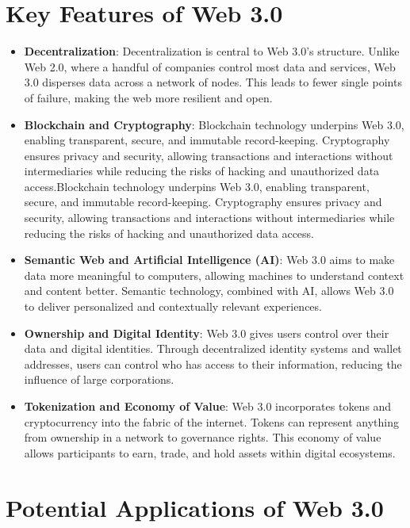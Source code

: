 \documentclass[12pt]{article}
\begin{document}
\section{Key Features of Web 3.0}

\begin{itemize}
    \item \textbf{Decentralization}: Decentralization is central to Web 3.0’s structure. Unlike Web 2.0, where a handful of companies control most data and services, Web 3.0 disperses data across a network of nodes. This leads to fewer single points of failure, making the web more resilient and open.
    \item \textbf{Blockchain and Cryptography}: Blockchain technology underpins Web 3.0, enabling transparent, secure, and immutable record-keeping. Cryptography ensures privacy and security, allowing transactions and interactions without intermediaries while reducing the risks of hacking and unauthorized data access.Blockchain technology underpins Web 3.0, enabling transparent, secure, and immutable record-keeping. Cryptography ensures privacy and security, allowing transactions and interactions without intermediaries while reducing the risks of hacking and unauthorized data access.
    \item \textbf{Semantic Web and Artificial Intelligence (AI)}: Web 3.0 aims to make data more meaningful to computers, allowing machines to understand context and content better. Semantic technology, combined with AI, allows Web 3.0 to deliver personalized and contextually relevant experiences.
    \item \textbf{Ownership and Digital Identity}: Web 3.0 gives users control over their data and digital identities. Through decentralized identity systems and wallet addresses, users can control who has access to their information, reducing the influence of large corporations.
    \item \textbf{Tokenization and Economy of Value}: Web 3.0 incorporates tokens and cryptocurrency into the fabric of the internet. Tokens can represent anything from ownership in a network to governance rights. This economy of value allows participants to earn, trade, and hold assets within digital ecosystems.
\end{itemize}

\section{Potential Applications of Web 3.0}
\end{document}
